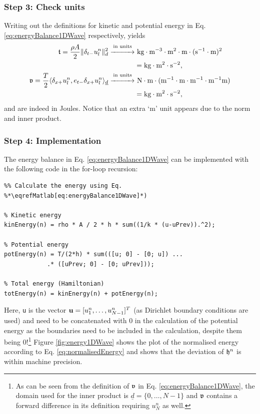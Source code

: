 {{\subsubsection{Step 3: Check units}
Writing out the definitions for kinetic and potential energy in Eq. \eqref{eq:energyBalance1DWave} respectively, yields
\begin{align*}
    \t = \frac{\rho A}{2}\lVert\dtm \uln\rVert^2_d \overset{\text{in units}}{\xrightarrow{\hspace*{1cm}}}& \ \text{kg}\cdot \text{m}^{-3} \cdot \text{m}^2\cdot \text{m} \cdot(\text{s}^{-1}\cdot \text{m})^{2}\\
    & = \text{kg}\cdot\text{m}^2\cdot\text{s}^{-2},\\
    \v = \frac{T}{2}\langle\dxp\uln, e_{t-}\dxp\uln\rangle_{\underline{d}}\overset{\text{in units}}{\xrightarrow{\hspace*{1cm}}}& \ \text{N} \cdot \text{m}\cdot (\text{m}^{-1}\cdot\text{m}\cdot \text{m}^{-1}\cdot\text{m}^{-1}\text{m}) \\
    & = \text{kg} \cdot \text{m}^2 \cdot \text{s}^{-2},
\end{align*}
and are indeed in Joules. Notice that an extra `m' unit appears due to the norm and inner product.

\subsubsection{Step 4: Implementation}
The energy balance in Eq. \eqref{eq:energyBalance1DWave} can be implemented with the following code in the for-loop recursion:

\setlstMAT
\begin{lstlisting}
%% Calculate the energy using Eq. %*\eqrefMatlab[eq:energyBalance1DWave]*) 

% Kinetic energy
kinEnergy(n) = rho * A / 2 * h * sum((1/k * (u-uPrev)).^2);

% Potential energy
potEnergy(n) = T/(2*h) * sum(([u; 0] - [0; u]) ...
            .* ([uPrev; 0] - [0; uPrev]));

% Total energy (Hamiltonian)
totEnergy(n) = kinEnergy(n) + potEnergy(n);
\end{lstlisting}
Here, \texttt{u} is the vector $\u = [u_1^n, \hdots, u_{N-1}^n]^T$ (as Dirichlet boundary conditions are used) and need to be concatenated with $0$ in the calculation of the potential energy as the boundaries need to be included in the calculation, despite them being 0!\footnote{As can be seen from the definition of $\v$ in Eq. \eqref{eq:energyBalance1DWave}, the domain used for the inner product is $\underline{d} = \{0,\hdots, N-1\}$ and $\v$ contains a forward difference in its definition requiring $u_N^n$ as well.}
Figure \ref{fig:energy1DWave} shows the plot of the normalised energy according to Eq. \eqref{eq:normalisedEnergy} and shows that the deviation of $\h^n$ is within machine precision.
\begin{figure}[h]
    \centering
    \begin{tikzpicture}[->,node distance=3cm,
        thick,main node/.style={circle,draw}]
    

\end{tikzpicture}
\end{figure}}}

